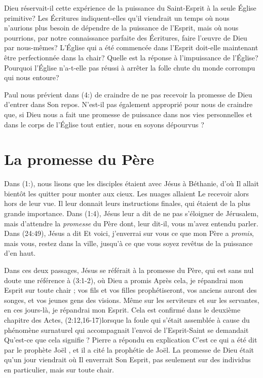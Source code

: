 Dieu réservait-il cette expérience de la puissance du Saint-Esprit à la seule
 Église primitive? Les Écritures indiquent-elles qu'il viendrait
 un temps où nous n'aurions plus besoin de dépendre de la puissance
 de l'Esprit, mais où nous pourrions, par notre connaissance parfaite
 des Écritures, faire l'œuvre de Dieu par nous-mêmes? L'Église qui a été
 commencée dans l'Esprit doit-elle maintenant être perfectionnée dans
 la chair?
 Quelle est la réponse à l'impuissance de l'Église?
 Pourquoi l'Église n'a-t-elle pas réussi à arrêter la folle chute
 du monde corrompu qui nous entoure?

Paul nous prévient dans (4:) de craindre de ne pas
 recevoir la promesse de Dieu d'entrer dans Son repos.
 N'est-il pas également approprié pour nous de craindre que, si Dieu
 nous a fait une promesse de puissance dans nos vies personnelles et
 dans le corps de l'Église tout entier, nous en soyons dépourvus ?


\section{La promesse du P\`ere}

Dans (1:), nous lisons que les disciples étaient avec
 Jésus à Béthanie, d'où Il allait bientôt les quitter pour monter
 aux cieux.
 Les nuages allaient Le recevoir alors hors de leur vue.
 Il leur donnait leurs instructions finales, qui étaient de la plus
 grande importance.
 Dans (1:4), Jésus leur a dit de \Og ne pas s'éloigner
 de Jérusalem, mais d'attendre la \emph{promesse} du Père dont, leur dit-il,
 vous m'avez entendu parler. \Fg{}
 Dans (24:49), Jésus a dit\frcolon{}
 \Og Et voici, j'enverrai sur vous ce que mon Père a \emph{promis}, mais vous,
 restez dans la ville, jusqu'à ce que vous soyez revêtus de la puissance
 d'en haut.\Fg{}

Dans ces deux passages, Jésus se référait à la promesse du Père, qui est
 sans nul doute une référence à (3:1-2), où Dieu a promis\frcolon{}
 \Og Après cela, je répandrai mon Esprit sur toute chair ;
 vos fils et vos filles prophétiseront, vos anciens auront des songes,
 et vos jeunes gens des visions.
 Même sur les serviteurs et sur les servantes,
 en ces jours-là, je répandrai mon Esprit. \Fg{}
 Cela est confirmé dans le deuxième chapitre des Actes,
 (2:12,16-17)lorsque la foule qui
 s'était assemblée à cause du phénomène surnaturel qui accompagnait l'envoi
 de l'Esprit-Saint se demandait\frcolon{}
 \Og Qu'est-ce que cela signifie ? \Fg{}
 Pierre a répondu en explication\frcolon{}
 \Og C'est ce qui a été dit par le prophète Joël \Fg{},
 et il a cité la prophétie de Joël.
 La promesse de Dieu était qu'un jour viendrait où Il enverrait Son Esprit,
 pas seulement sur des individus en particulier, mais sur toute chair.

